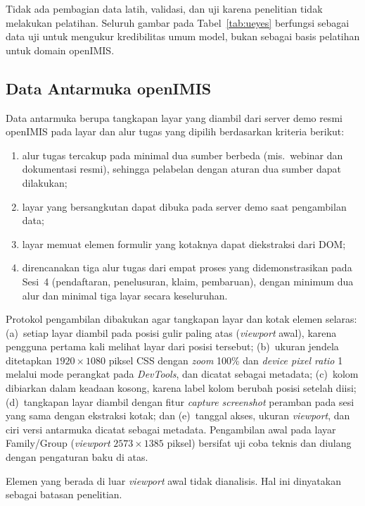 Tidak ada pembagian data latih, validasi, dan uji karena penelitian tidak melakukan pelatihan. Seluruh gambar pada Tabel~\ref{tab:ueyes} berfungsi sebagai data uji untuk mengukur kredibilitas umum model, bukan sebagai basis pelatihan untuk domain openIMIS.

\subsection{Data Antarmuka openIMIS}
\label{subsec:data-openimis}

Data antarmuka berupa tangkapan layar yang diambil dari server demo resmi openIMIS pada layar dan alur tugas yang dipilih berdasarkan kriteria berikut:
\begin{enumerate}
  \item alur tugas tercakup pada minimal dua sumber berbeda (mis.\ webinar dan dokumentasi resmi), sehingga pelabelan dengan aturan dua sumber dapat dilakukan;
  \item layar yang bersangkutan dapat dibuka pada server demo saat pengambilan data;
  \item layar memuat elemen formulir yang kotaknya dapat diekstraksi dari DOM;
  \item direncanakan tiga alur tugas dari empat proses yang didemonstrasikan pada Sesi~4 (pendaftaran, penelusuran, klaim, pembaruan), dengan minimum dua alur dan minimal tiga layar secara keseluruhan.
\end{enumerate}

Protokol pengambilan dibakukan agar tangkapan layar dan kotak elemen selaras: (a)~setiap layar diambil pada posisi gulir paling atas (\emph{viewport} awal), karena pengguna pertama kali melihat layar dari posisi tersebut; (b)~ukuran jendela ditetapkan $1920 \times 1080$ piksel CSS dengan \emph{zoom} 100\% dan \emph{device pixel ratio} 1 melalui mode perangkat pada \emph{DevTools}, dan dicatat sebagai metadata; (c)~kolom dibiarkan dalam keadaan kosong, karena label kolom berubah posisi setelah diisi; (d)~tangkapan layar diambil dengan fitur \emph{capture screenshot} peramban pada sesi yang sama dengan ekstraksi kotak; dan (e)~tanggal akses, ukuran \emph{viewport}, dan ciri versi antarmuka dicatat sebagai metadata. Pengambilan awal pada layar Family/Group (\emph{viewport} $2573 \times 1385$ piksel) bersifat uji coba teknis dan diulang dengan pengaturan baku di atas.

Elemen yang berada di luar \emph{viewport} awal tidak dianalisis. Hal ini dinyatakan sebagai batasan penelitian.

